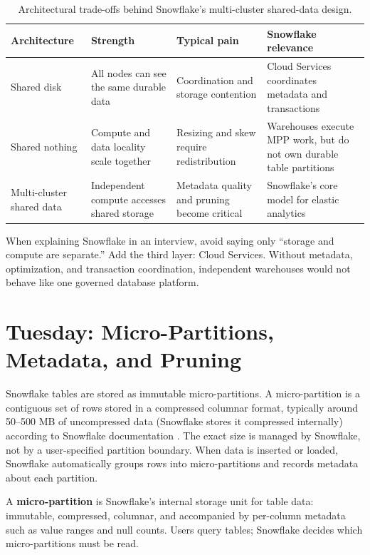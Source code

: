 \begin{table}[H]
\centering
\small
\begin{tabular}{@{}p{3.0cm}p{4.1cm}p{4.1cm}p{3.2cm}@{}}
\toprule
\textbf{Architecture} & \textbf{Strength} & \textbf{Typical pain} & \textbf{Snowflake relevance} \\
\midrule
Shared disk & All nodes can see the same durable data & Coordination and storage contention & Cloud Services coordinates metadata and transactions \\
Shared nothing & Compute and data locality scale together & Resizing and skew require redistribution & Warehouses execute MPP work, but do not own durable table partitions \\
Multi-cluster shared data & Independent compute accesses shared storage & Metadata quality and pruning become critical & Snowflake's core model for elastic analytics \\
\bottomrule
\end{tabular}
\caption{Architectural trade-offs behind Snowflake's multi-cluster shared-data design.}
\label{tab:chapter1-architecture-comparison}
\end{table}

\begin{tipbox}
When explaining Snowflake in an interview, avoid saying only ``storage and compute are separate.'' Add the third layer: Cloud Services. Without metadata, optimization, and transaction coordination, independent warehouses would not behave like one governed database platform.
\end{tipbox}

\section{Tuesday: Micro-Partitions, Metadata, and Pruning}
Snowflake tables are stored as immutable micro-partitions. A micro-partition is a contiguous set of rows stored in a compressed columnar format, typically around 50--500 MB of uncompressed data (Snowflake stores it compressed internally) according to Snowflake documentation \cite{snowflakeTablesDocs}. The exact size is managed by Snowflake, not by a user-specified partition boundary. When data is inserted or loaded, Snowflake automatically groups rows into micro-partitions and records metadata about each partition.

\begin{definitionbox}
A \textbf{micro-partition} is Snowflake's internal storage unit for table data: immutable, compressed, columnar, and accompanied by per-column metadata such as value ranges and null counts. Users query tables; Snowflake decides which micro-partitions must be read.
\end{definitionbox}

